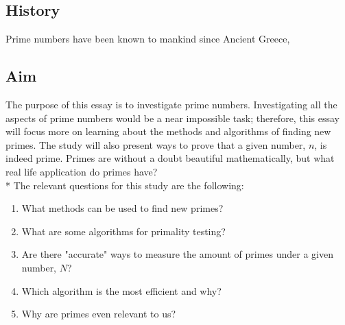 \documentclass[main.tex]{subfiles}
\begin{document}
\subsection{History}
Prime numbers have been known to mankind since Ancient Greece, \cite{prime}




\subsection{Aim}
The purpose of this essay is to investigate prime numbers. Investigating all the aspects of prime numbers would be a near impossible task; therefore, this essay will focus more on learning about the methods and algorithms of finding new primes. The study will also present ways to prove that a given number, $n$, is indeed prime. Primes are without a doubt beautiful mathematically, but what real life application do primes have?
\newline
\\*
The relevant questions for this study are the following:
\begin{enumerate}
    \item What methods can be used to find new primes?
    \item What are some algorithms for primality testing?
    \item Are there "accurate" ways to measure the amount of primes under a given number, $N$?
    \item Which algorithm is the most efficient and why?
    \item Why are primes even relevant to us?
\end{enumerate}
\end{document}
